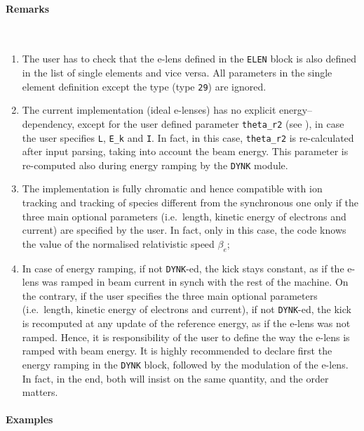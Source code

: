 \paragraph{Remarks}~\\

\begin{enumerate}
\item The user has to check that the e-lens defined in the \texttt{ELEN} block is also defined in the list of single elements and vice versa.
  All parameters in the single element definition except the type (type \texttt{29}) are ignored.
\item The current implementation (ideal e-lenses) has no explicit energy--dependency, except for the user defined parameter \texttt{theta\_r2} (see \cite{sixphys}), in case the user specifies \texttt{L}, \texttt{E\_k} and \texttt{I}. In fact, in this case, \texttt{theta\_r2} is re-calculated after input parsing, taking into account the beam energy. This parameter is re-computed also during energy ramping by the \texttt{DYNK} module.
\item The implementation is fully chromatic and hence compatible with ion tracking and tracking of species different from the synchronous one only if the three main optional parameters (i.e.~length, kinetic energy of electrons and current) are specified by the user. In fact, only in this case, the code knows the value of the normalised relativistic speed $\beta_e$;
\item In case of energy ramping, if not \texttt{DYNK}-ed, the kick stays constant, as if the e-lens was ramped in beam current in synch with the rest of the machine. On the contrary, if the user specifies the three main optional parameters (i.e.~length, kinetic energy of electrons and current), if not \texttt{DYNK}-ed, the kick is recomputed at any update of the reference energy, as if the e-lens was not ramped. Hence, it is responsibility of the user to define the way the e-lens is ramped with beam energy. It is highly recommended to declare first the energy ramping in the \texttt{DYNK} block, followed by the modulation of the e-lens. In fact, in the end, both will insist on the same quantity, and the order matters.
\end{enumerate}

\paragraph{Examples}~\\

